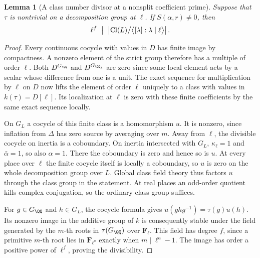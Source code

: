 \documentclass[a4paper,11pt]{article}
\newtheorem{lemma}[proposition]{Lemma}
\theoremstyle{definition}
\theoremstyle{remark}
\numberwithin{equation}{section}
\newcommand{\Cl}{\operatorname{Cl}}
\begin{document}
\begin{lemma}[A class number divisor at a nonsplit coefficient prime]\leavevmode
\label{lem:collisionclass457}
Suppose that \(\tau\) is nontrivial on a decomposition group at
\(\ell\). If \(S(\alpha,r)\ne0\), then
\[
 \ell^f\ \bigm|\ 
 \left|\Cl(L)\big/\big\langle[\lambda]\mathrel{:}\lambda\mid\ell
                                      \big\rangle\right|.
\]
\end{lemma}
\begin{proof}
Every continuous cocycle with values in \(D\) has finite image by
compactness. A nonzero element of the strict group therefore has
a multiple of order \(\ell\). Both \(D^{G_{\QQ}}\) and
\(D^{G_{\QQ_\ell}}\) are zero since some local element acts by a
scalar whose difference from one is a unit. The exact sequence
for multiplication by \(\ell\) on \(D\) now lifts the element of
order \(\ell\) uniquely to a class with values in \(k(\tau)=D[\ell]\).
Its localization at \(\ell\) is zero with these finite coefficients
by the same exact sequence locally.

On \(G_L\) a cocycle of this finite class is a homomorphism \(u\).
It is nonzero, since inflation from \(\Delta\) has zero source by
averaging over \(m\). Away from \(\ell\), the divisible cocycle on
inertia is a coboundary. On inertia intersected with \(G_L\),
\(\kappa_\ell=1\) and \(\bar\alpha=1\), so also \(\alpha=1\).
There the coboundary is zero and hence so is \(u\). At every place
over \(\ell\) the finite cocycle itself is locally a coboundary, so
\(u\) is zero on the whole decomposition group over \(L\).
Global class field theory thus factors \(u\) through the class group
in the statement. At real places an odd-order quotient kills
complex conjugation, so the ordinary class group suffices.

For \(g\in G_{\QQ}\) and \(h\in G_L\), the cocycle formula gives
\(u(ghg^{-1})=\tau(g)u(h)\). Its nonzero image in the additive
group of \(k\) is consequently stable under the field generated
by the \(m\)-th roots in \(\tau(G_{\QQ})\) over \(\mathbf F_\ell\).
This field has degree \(f\), since a primitive \(m\)-th root lies
in \(\mathbf F_{\ell^a}\) exactly when \(m\mid\ell^a-1\).
The image has order a positive power of \(\ell^f\), proving the
divisibility.
\end{proof}
\end{document}
